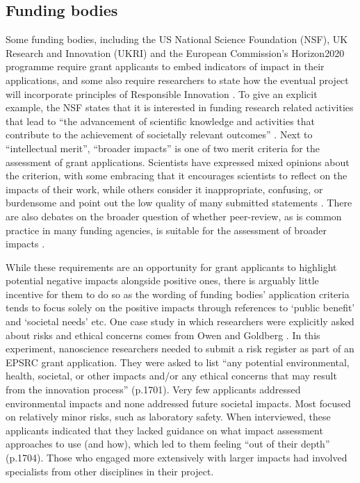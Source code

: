 \documentclass[11pt,english]{article}
\begin{document}
	\subsection*{Funding bodies}
	
	Some funding bodies, including the US  National Science Foundation (NSF), UK Research and Innovation (UKRI) and the European Commission's Horizon2020 programme require grant applicants to embed indicators of impact in their applications, and some also require researchers to state how the eventual project will incorporate principles of Responsible Innovation \citep{epsrc_framework_2020}. To give an explicit example, the NSF states that it is interested in funding research related activities that lead to ``the advancement of scientific knowledge and activities that contribute to the achievement of societally relevant outcomes'' \citep{nsf_proposal_2018}. Next to ``intellectual merit'', ``broader impacts'' is one of two merit criteria for the assessment of grant applications.  Scientists have expressed mixed opinions about the criterion, with some embracing that it encourages scientists to reflect on the impacts of their work, while others consider it inappropriate, confusing, or burdensome and point out the low quality of many submitted statements \citep{tretkoff_nsfs_2007,frodeman_sciences_2007}. There are also debates on the broader question of whether peer-review, as is common practice in many funding agencies, is suitable for the assessment of broader impacts \citep{bozeman_broad_2009,holbrook_peer_2011,bozeman_socio-economic_2017,hecht_its_2018}. 
	
	While these requirements are an opportunity for grant applicants to highlight potential negative impacts alongside positive ones,  there is arguably little incentive for them to do so as the wording of funding bodies' application criteria tends to focus solely on the positive impacts through references to `public benefit' and `societal needs' etc. One case study in which researchers were explicitly asked about risks and ethical concerns comes from Owen and Goldberg \citep{owen_responsible_2010}. In this experiment, nanoscience researchers needed to  submit a risk register as part of an EPSRC grant application. They were asked to list ``any potential environmental, health, societal, or other impacts and/or any ethical concerns that may result from the innovation process'' (p.1701). Very few applicants addressed environmental impacts and none addressed future societal impacts. Most focused on relatively minor risks, such as laboratory safety. When interviewed, these applicants indicated that they lacked guidance on what impact assessment approaches to use (and how), which led to them feeling ``out of their depth'' (p.1704). Those who engaged more extensively with larger impacts had involved specialists from other disciplines in their project. 
	
\end{document}
